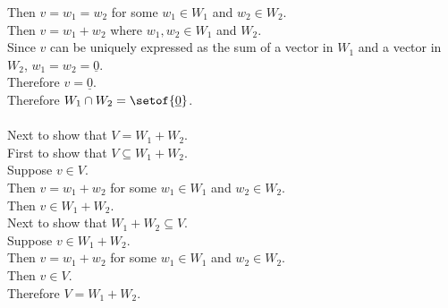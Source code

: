 \documentclass[answers,12pt,addpoints]{exam}
\begin{document}
\begin{questions}
\begin{solution}
        Then $v = w_1 = w_2$ for some $w_1 \in W_1$ and $w_2 \in W_2$.\\
        Then $v = w_1 + w_2$ where $w_1, w_2 \in W_1$ and $W_2$.\\
        Since $v$ can be uniquely expressed as the sum of a vector in $W_1$ and a vector in $W_2$, $w_1 = w_2 = \underline{0}$.\\
        Therefore $v = \underline{0}$.\\
        Therefore $W_1 \cap W_2 = \setof{\underline{0}}$.\\\\
        Next to show that $V = W_1 + W_2$.\\
        First to show that $V \subseteq W_1 + W_2$.\\
        Suppose $v \in V$.\\
        Then $v = w_1 + w_2$ for some $w_1 \in W_1$ and $w_2 \in W_2$.\\
        Then $v \in W_1 + W_2$.\\
        Next to show that $W_1 + W_2 \subseteq V$.\\
        Suppose $v \in W_1 + W_2$.\\
        Then $v = w_1 + w_2$ for some $w_1 \in W_1$ and $w_2 \in W_2$.\\
        Then $v \in V$.\\
        Therefore $V = W_1 + W_2$.
    \end{solution}


\end{questions}
\end{document}
